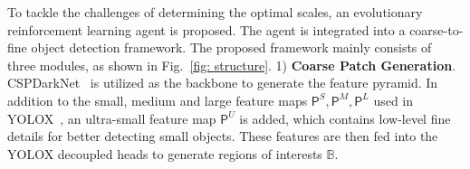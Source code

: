 \documentclass[letterpaper]{article} %
\newcommand\blue[1]{\textcolor{blue}{#1}}
\newcommand\rjf[1]{\textcolor{red}{\{RJF: #1\}}}
\begin{document}
To tackle the challenges of determining the optimal scales, 
an evolutionary reinforcement learning agent is proposed. The agent is integrated into a coarse-to-fine object detection framework. The proposed framework mainly consists of three modules, as shown in Fig.~\ref{fig: structure}. 
1) \textbf{Coarse Patch Generation}. %
CSPDarkNet~\cite{Wang_2021_ScaledYOLOv4} is utilized as the backbone to generate the feature pyramid. %
In addition to the small, medium and large feature maps $\bm{\mathsf{P}}^S,\bm{\mathsf{P}}^M,\bm{\mathsf{P}}^L$ used in YOLOX~\cite{Ge_2021_YOLOX}, an ultra-small feature map $\bm{\mathsf{P}}^{U}$ is added, which contains low-level fine details for better detecting small objects. 
These features are then fed into the YOLOX decoupled heads to generate regions of interests $\mathbb{B}$. %
\end{document}
